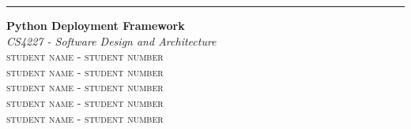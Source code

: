 \begin{titlepage}
	\raggedleft
	
	\rule{1pt}{\textheight}
	\hspace{0.05\textwidth}
	\parbox[b]{0.75\textwidth}{
		
		{\Huge\bfseries Python Deployment Framework}\\[2\baselineskip]
		{\large\textit{CS4227 - Software Design and Architecture}}\\[4\baselineskip]
		{\Large\textsc{student name - student number}}\\[1\baselineskip]
		{\Large\textsc{student name - student number}}\\[1\baselineskip]
		{\Large\textsc{student name - student number}}\\[1\baselineskip]
		{\Large\textsc{student name - student number}}\\[1\baselineskip]
		{\Large\textsc{student name - student number}}\\[1\baselineskip]
		
		\vspace{0.25\textheight}
	}
\end{titlepage}